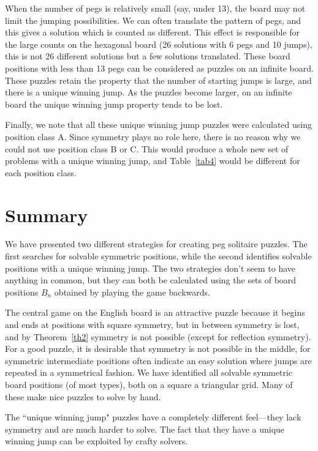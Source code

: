 \documentclass[12pt,reqno]{article}
\begin{document}
When the number of pegs is relatively small (say, under 13), the board may not limit the jumping possibilities.
We can often translate the pattern of pegs, and this gives a solution which is counted as different.
This effect is responsible for the large counts on the hexagonal board (26 solutions with 6 pegs and 10 jumps),
this is not 26 different solutions but a few solutions translated.
These board positions with less than 13 pegs can be considered as puzzles on an infinite board.
These puzzles retain the property that the number of starting jumps is large,
and there is a unique winning jump.
As the puzzles become larger, on an infinite board the unique winning jump property tends to be lost.

Finally, we note that all these unique winning jump puzzles were calculated using position class A.
Since symmetry plays no role here, there is no reason why we could not use position class B or C.
This would produce a whole new set of problems with a unique winning jump,
and Table~\ref{tab4} would be different for each position class.

\section{Summary}
\label{sec:summary}

We have presented two different strategies for creating peg solitaire puzzles.
The first searches for solvable symmetric positions,
while the second identifies solvable positions with a unique winning jump.
The two strategies don't seem to have anything in common,
but they can both be calculated using the sets of board positions $B_n$
obtained by playing the game backwards.

The central game on the English board is an attractive puzzle because
it begins and ends at positions with square symmetry,
but in between symmetry is lost, and by Theorem~\ref{th2} symmetry is not possible
(except for reflection symmetry).
For a good puzzle,
it is desirable that symmetry is not possible in the middle,
for symmetric intermediate positions often indicate an easy solution where jumps are repeated in a symmetrical fashion.
We have identified all solvable symmetric board positions (of most types), both on a square a triangular grid.
Many of these make nice puzzles to solve by hand.

The ``unique winning jump" puzzles have a completely different feel---they lack
symmetry and are much harder to solve.
The fact that they have a unique winning jump can be exploited by crafty solvers.
\end{document}
